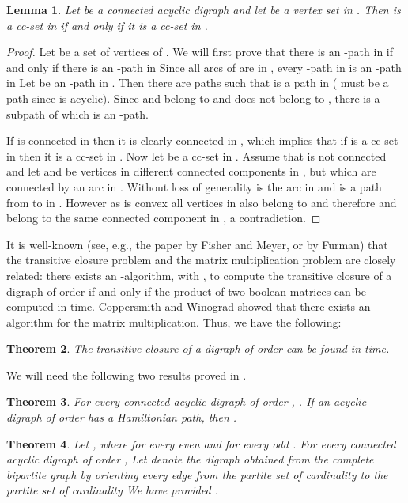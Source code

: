 \documentclass[11pt]{article}
\newcommand{\2}{\vspace{0.2 cm}}
\newtheorem{theorem}{Theorem}[section]
\newtheorem{lemma}[theorem]{Lemma}
\begin{document}
\begin{lemma} \label{lemma_transitive}
Let  be a connected acyclic digraph and let  be a vertex set
in . Then  is a cc-set in  if and only if it is a cc-set in
.
\end{lemma}
\begin{proof} Let  be a set of vertices of . We will first prove that
there is an -path in  if and only if there is an -path in
 Since all arcs of  are in , every -path in
 is an -path in  Let  be an
-path in . Then there are paths 
such that  is a path in 
( must be a path since  is acyclic). Since  and 
belong to  and  does not belong to , there is a subpath
of  which is an -path.

If  is connected in  then it is clearly connected in ,
which implies that if  is a cc-set in  then it is a cc-set in
. Now let  be a cc-set in . Assume that  is
not connected and let  and  be vertices in different connected
components in , but which are connected by an arc in .
Without loss of generality  is the arc in  and  is a
path from  to  in . However as  is convex all vertices
in  also belong to  and therefore  and  belong to the
same connected component in , a contradiction. \end{proof}

\vspace{3mm}

It is well-known  (see, e.g., the paper
\cite{fisher1971}  by Fisher and Meyer, or \cite{furmanSMD11} by
Furman) that the transitive closure problem and the matrix
multiplication problem are closely related: there exists an
-algorithm, with , to compute the transitive
closure of a digraph of order  if and only if the product of
two boolean  matrices can be computed in  time. 
Coppersmith and Winograd \cite{coppersmith1987}
showed that there exists an -algorithm for the
matrix multiplication. Thus, we have the following:

\begin{theorem}\label{remtr}
The transitive closure of a digraph of order  can be found in
 time. 
\end{theorem}

We will need the following two results proved in \cite{GuYe}.

\begin{theorem} \label{lower_bound}
For every connected acyclic  digraph  of order ,  . If an acyclic digraph  of order  has a Hamiltonian path, then
  .
\end{theorem}

\begin{theorem}\label{upper_bound}
Let , where  for every even
 and  for every odd . For every
connected acyclic  digraph  of order ,   Let
 denote the digraph obtained from the complete
bipartite graph  by orienting every edge from the partite
set of cardinality  to the partite set of cardinality  We
have  provided .
\end{theorem}
\end{document}
